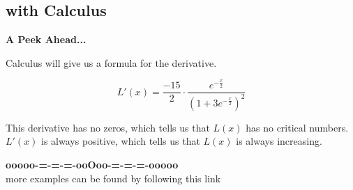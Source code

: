\documentclass{ximera}
\begin{document}
\subsection*{with Calculus}

\textbf{\textcolor{red!70!black}{A Peek Ahead...}}




Calculus will give us a formula for the derivative.

\[  L'(x) =   \frac{-15}{2} \cdot \frac{e^{-\tfrac{x}{2}}}{\left(1+3 e^{-\tfrac{x}{2}}\right)^2}    \]


This derivative has no zeros, which tells us that $L(x)$ has no critical numbers.  $L'(x)$ is always positive, which tells us that $L(x)$ is always increasing.












\begin{center}
\textbf{\textcolor{green!50!black}{ooooo-=-=-=-ooOoo-=-=-=-ooooo}} \\

more examples can be found by following this link\\ 

\end{center}
\end{document}
